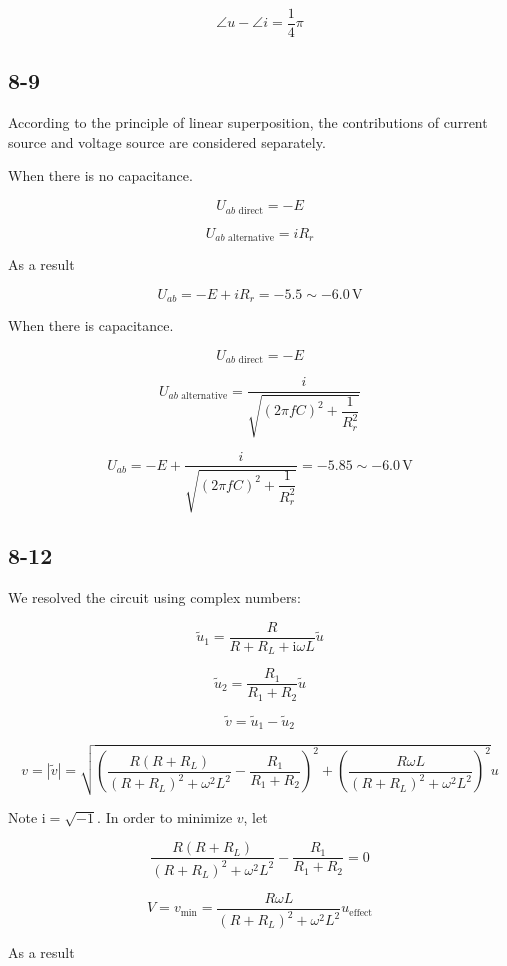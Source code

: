 \documentclass[a4paper,11pt]{amsart}
\theoremstyle{definition}
\begin{document}
	$$
	\angle u-\angle i=\frac{1}{4}\pi 
	$$
		
	\subsection*{8-9}
	
	According to the principle of linear superposition, the contributions of current source and voltage source are considered separately.
	
	When there is no capacitance.
	
	$$
	U_{ab\,\,\mathrm{direct}}=-E
	$$
	
	$$
	U_{ab\,\,\mathrm{alternative}}=iR_r
	$$
	
	As a result
	
	$$
	U_{ab}=-E+iR_r=-5.5\sim-6.0\,\mathrm{V}
	$$
	
	When there is capacitance.
	
	$$
	U_{ab\,\,\mathrm{direct}}=-E
	$$
	
	$$
	U_{ab\,\,\mathrm{alternative}}=\frac{i}{\sqrt{\left( 2\pi fC \right) ^2+\dfrac{1}{R_{r}^{2}}}}
	$$
	
	$$
	U_{ab}=-E+\frac{i}{\sqrt{\left( 2\pi fC \right) ^2+\dfrac{1}{R_{r}^{2}}}}=-5.85\sim -6.0\,\mathrm{V}
	$$
	
	\subsection*{8-12}
	
	We resolved the circuit using complex numbers:
	
	
	$$
	\tilde{u}_1=\frac{R}{R+R_L+\mathrm{i}\omega L}\tilde{u}
	$$
	
	$$
	\tilde{u}_2=\frac{R_1}{R_1+R_2}\tilde{u}
	$$
	
	$$
	\tilde{v}=\tilde{u}_1-\tilde{u}_2
	$$
	
	$$
	v=|\tilde{v}|=\sqrt{\left( \frac{R\left( R+R_L \right)}{\left( R+R_L \right) ^2+\omega ^2L^2}-\frac{R_1}{R_1+R_2} \right) ^2+\left( \frac{R\omega L}{\left( R+R_L \right) ^2+\omega ^2L^2} \right) ^2}u
	$$
	
	Note $\mathrm{i}=\sqrt{-1}$. In order to minimize $v$, let
	
	$$
	\frac{R\left( R+R_L \right)}{\left( R+R_L \right) ^2+\omega ^2L^2}-\frac{R_1}{R_1+R_2}=0
	$$
	
	$$
	V=v_{\min}=\frac{R\omega L}{\left( R+R_L \right) ^2+\omega ^2L^2}u_{\mathrm{effect}}
	$$
	
	As a result
	
\end{document}
